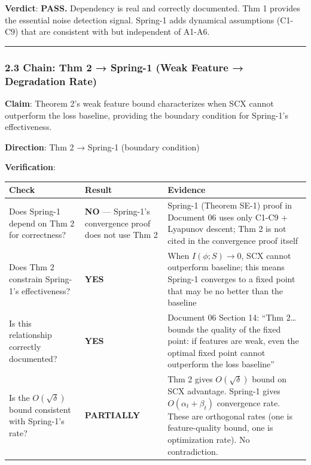 \documentclass[
  12pt,
]{ctexart}
\begin{document}
\textbf{Verdict}: \textbf{PASS.} Dependency is real and correctly
documented. Thm 1 provides the essential noise detection signal.
Spring-1 adds dynamical assumptions (C1-C9) that are consistent with but
independent of A1-A6.

\begin{center}\rule{0.5\linewidth}{0.5pt}\end{center}

\subsubsection{2.3 Chain: Thm 2 → Spring-1 (Weak Feature → Degradation
Rate)}\label{chain-thm-2-spring-1-weak-feature-degradation-rate}

\textbf{Claim}: Theorem 2's weak feature bound characterizes when SCX
cannot outperform the loss baseline, providing the boundary condition
for Spring-1's effectiveness.

\textbf{Direction}: Thm 2 → Spring-1 (boundary condition)

\textbf{Verification}:

\begin{longtable}[]{@{}
  >{\raggedright\arraybackslash}p{}
  >{\raggedright\arraybackslash}p{}
  >{\raggedright\arraybackslash}p{}@{}}
\toprule\noalign{}
\begin{minipage}[b]{\linewidth}\raggedright
Check
\end{minipage} & \begin{minipage}[b]{\linewidth}\raggedright
Result
\end{minipage} & \begin{minipage}[b]{\linewidth}\raggedright
Evidence
\end{minipage} \\
\midrule\noalign{}
\endhead
\bottomrule\noalign{}
\endlastfoot
Does Spring-1 depend on Thm 2 for correctness? & \textbf{NO} ---
Spring-1's convergence proof does not use Thm 2 & Spring-1 (Theorem
SE-1) proof in Document 06 uses only C1-C9 + Lyapunov descent; Thm 2 is
not cited in the convergence proof itself \\
Does Thm 2 constrain Spring-1's effectiveness? & \textbf{YES} & When
\(I(\phi; S) \to 0\), SCX cannot outperform baseline; this means
Spring-1 converges to a fixed point that may be no better than the
baseline \\
Is this relationship correctly documented? & \textbf{YES} & Document 06
Section 14: ``Thm 2\ldots bounds the quality of the fixed point: if
features are weak, even the optimal fixed point cannot outperform the
loss baseline'' \\
Is the \(O(\sqrt{\delta})\) bound consistent with Spring-1's rate? &
\textbf{PARTIALLY} & Thm 2 gives \(O(\sqrt{\delta})\) bound on SCX
advantage. Spring-1 gives \(O(\alpha_t + \beta_t)\) convergence rate.
These are orthogonal rates (one is feature-quality bound, one is
optimization rate). No contradiction. \\
\end{longtable}
\end{document}
